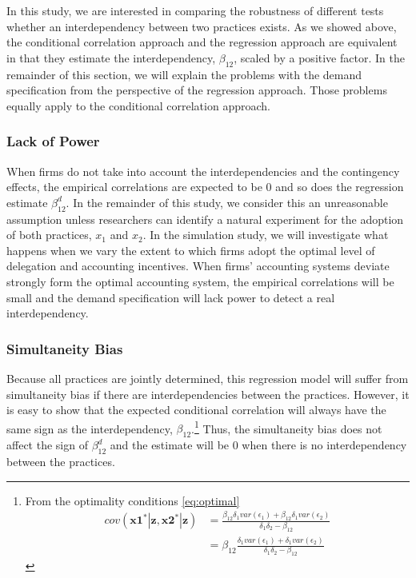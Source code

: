 \documentclass[12pt]{article}
\begin{document}
In this study, we are interested in comparing the robustness of different tests whether an interdependency between two practices exists. As we showed above, the conditional correlation approach and the regression approach are equivalent in that they estimate the interdependency, $\beta_{12}$, scaled by a positive factor. In the remainder of this section, we will explain the problems with the demand specification from the perspective of the regression approach. Those problems equally apply to the conditional correlation approach.  

\subsubsection{Lack of Power}

When firms do not take into account the interdependencies and the contingency effects, the empirical correlations are expected to be 0 and so does the regression estimate $\beta_{12}^d$. In the remainder of this study, we consider this an unreasonable assumption unless researchers can identify a natural experiment for the adoption of both practices, $x_1$ and $x_2$. In the simulation study, we will investigate what happens when we vary the extent to which firms adopt the optimal level of delegation and accounting incentives. When firms' accounting systems deviate strongly form the optimal accounting system, the empirical correlations will be small and the demand specification will lack power to detect a real interdependency.

\subsubsection{Simultaneity Bias}

Because all practices are jointly determined, this regression model will suffer from simultaneity bias \citep{Chenhall2007} if there are interdependencies between the practices. However, it is easy to show that the expected conditional correlation will always have the same sign as the interdependency, $\beta_{12}$.\footnote{From the optimality conditions \eqref{eq:optimal}
\begin{align*}
cov(\mathbf{x1^*}|\mathbf{z}, \mathbf{x2^*}|\mathbf{z}) 
&= \frac{\beta_{12} \delta_1 var(\epsilon_1) + \beta_{12} \delta_1 var(\epsilon_2)}{\delta_1 \delta_2 - \beta_{12}} \\
&= \beta_{12} \frac{\delta_1 var(\epsilon_1) + \delta_1 var(\epsilon_2)}{\delta_1 \delta_2 - \beta_{12}}
\end{align*}}
Thus, the simultaneity bias does not affect the sign of $\beta^d_{12}$ and the estimate will be 0 when there is no interdependency between the practices. 
\end{document}
